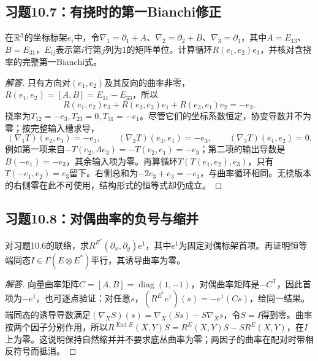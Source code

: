 \subsection*{习题10.7：有挠时的第一Bianchi修正}
在$\mathbb{R}^3$的坐标标架$e_i$中，令$\nabla_1=\partial_1+A$、$\nabla_2=\partial_2+B$、$\nabla_3=\partial_3$，其中$A=E_{13}$、$B=E_{31}$，$E_{ij}$表示第$i$行第$j$列为$1$的矩阵单位。计算循环$R(e_1,e_2)e_3$，并核对含挠率的完整第一Bianchi式。
\begin{proof}[解答]
只有方向对$(e_1,e_2)$及其反向的曲率非零，$R(e_1,e_2)=[A,B]=E_{11}-E_{33}$，所以
\[
 R(e_1,e_2)e_3+R(e_2,e_3)e_1+R(e_3,e_1)e_2=-e_3.
\]
挠率为$T_{12}=-e_3,T_{23}=0,T_{31}=-e_1$。尽管它们的坐标系数恒定，协变导数并不为零；按完整输入槽求导，
\[
 (\nabla_1T)(e_2,e_3)=-e_3,\qquad
 (\nabla_2T)(e_3,e_1)=-e_3,\qquad
 (\nabla_3T)(e_1,e_2)=0.
\]
例如第一项来自$-T(e_2,Ae_3)=-T(e_2,e_1)=-e_3$；第二项的输出导数是$B(-e_1)=-e_3$，其余输入项为零。再算循环$T(T(e_1,e_2),e_3)$，只有$T(-e_1,e_2)=e_3$留下。右侧总和为$-2e_3+e_3=-e_3$，与曲率循环相同。无挠版本的右侧零在此不可使用，结构形式的恒等式却仍成立。
\end{proof}

\subsection*{习题10.8：对偶曲率的负号与缩并}
对习题10.6的联络，求$R^{E^*}(\partial_x,\partial_y)e^1$，其中$e^1$为固定对偶标架首项。再证明恒等端同态$I\in\Gamma(E\otimes E^*)$平行，其诱导曲率为零。
\begin{proof}[解答]
向量曲率矩阵$C=[A,B]=\operatorname{diag}(1,-1)$，对偶曲率矩阵是$-C^{\mathsf T}$，因此首项为$-e^1$。也可逐点验证：对任意$s$，$(R^{E^*}e^1)(s)=-e^1(Cs)$，给同一结果。
端同态的诱导导数满足$(\nabla_XS)(s)=\nabla_X(Ss)-S\nabla_Xs$，令$S=I$得到零。曲率按两个因子分别作用，所以$R^{\operatorname{End}E}(X,Y)S=R^E(X,Y)S-SR^E(X,Y)$，在$I$上为零。这说明保持自然缩并并不要求底丛曲率为零；两因子的曲率在配对时带相反符号而抵消。
\end{proof}
